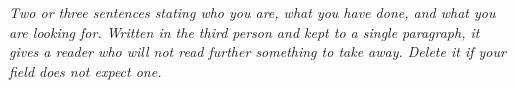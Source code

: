%
\vspace{1em}
\textit{Two or three sentences stating who you are, what you have done, and what you are looking for. Written in the third person and kept to a single paragraph, it gives a reader who will not read further something to take away. Delete it if your field does not expect one.}
